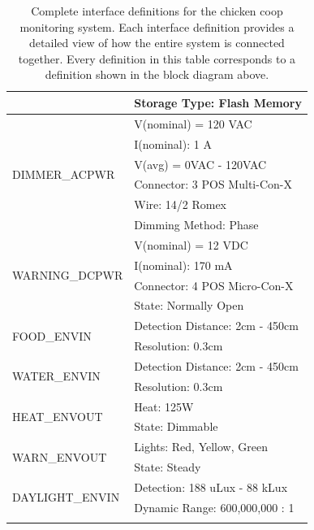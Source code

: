 \documentclass{article}
\begin{document}
\begin{longtable}{|l|l|}
                                 & Storage Type: Flash Memory                \\* 
\hline
\multirow{6}{*}{DIMMER\_ACPWR}   & V(nominal) = 120 VAC                      \\*
                                 & I(nominal): 1 A                           \\*
                                 & V(avg) = 0VAC - 120VAC                    \\*
                                 & Connector: 3 POS Multi-Con-X              \\*
                                 & Wire: 14/2 Romex                          \\*
                                 & Dimming Method: Phase                     \\* 
\hline
\multirow{4}{*}{WARNING\_DCPWR}  & V(nominal) = 12 VDC                       \\*
                                 & I(nominal): 170 mA                        \\*
                                 & Connector: 4 POS Micro-Con-X              \\*
                                 & State: Normally Open                      \\* 
\hline
\multirow{2}{*}{FOOD\_ENVIN}     & Detection Distance: 2cm - 450cm           \\*
                                 & Resolution: 0.3cm                         \\* 
\hline
\multirow{2}{*}{WATER\_ENVIN}    & Detection Distance: 2cm - 450cm           \\*
                                 & Resolution: 0.3cm                         \\* 
\hline
\multirow{2}{*}{HEAT\_ENVOUT}    & Heat: 125W                                \\*
                                 & State: Dimmable                           \\* 
\hline
\multirow{2}{*}{WARN\_ENVOUT}    & Lights: Red, Yellow, Green                \\*
                                 & State: Steady                             \\* 
\hline
\multirow{2}{*}{DAYLIGHT\_ENVIN} & Detection: 188 uLux - 88 kLux             \\*
                                 & Dynamic Range: 600,000,000 : 1            \\
\hline
\caption{Complete interface definitions for the chicken coop monitoring system.  Each interface definition provides a detailed view of how the entire system is connected together. Every definition in this table corresponds to a definition shown in the block diagram above.}
\end{longtable}
\end{document}
